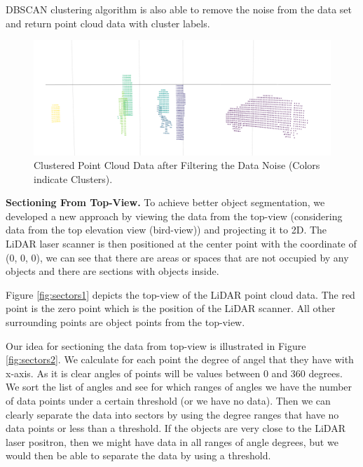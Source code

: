 DBSCAN clustering algorithm is also able to remove the noise from the data set and return point cloud data with cluster labels.


\begin{figure}[!h]
\begin{center}
  \includegraphics[width=.55\linewidth]{./images/seg_noise_removal.png}
  \caption{Clustered Point Cloud Data after Filtering the Data Noise (Colors indicate Clusters). }
  \label{fig:ClusteringWithNoiseFiltering}
\end{center}
\end{figure}



\textbf{Sectioning From Top-View.}
To achieve better object segmentation, we developed a new approach by viewing the data from the top-view (considering data from the top elevation view (bird-view)) and projecting it to 2D. The LiDAR laser scanner is then positioned at the center point with the coordinate of (0, 0, 0), we can see that there are areas or spaces that are not occupied by any objects and there are sections with objects inside.

Figure \ref{fig:sectors1} depicts the top-view of the LiDAR point cloud data.
The red point is the zero point which is the position of the LiDAR scanner. All other surrounding points are object points from the top-view.

Our idea for sectioning the data from top-view is illustrated in Figure \ref{fig:sectors2}. We calculate for each point the degree of angel that they have with x-axis. As it is clear angles of points will be values between 0 and 360 degrees. We sort the list of angles and see for which ranges of angles we have the number of data points under a certain threshold (or we have no data). Then we can clearly separate the data into sectors by using the degree ranges that have no data points or less than a threshold. If the objects are very close to the LiDAR laser positron, then we might have data in all ranges of angle degrees, but we would then be able to separate the data by using a threshold.


